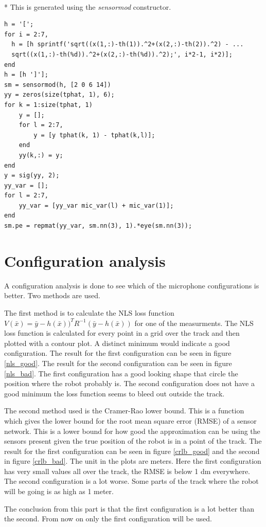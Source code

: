 \documentclass[10pt,a4paper]{report}
\begin{document}
\\*
This is generated using the \emph{sensormod} constructor.
\begin{verbatim}
h = '[';
for i = 2:7,
  h = [h sprintf('sqrt((x(1,:)-th(1)).^2+(x(2,:)-th(2)).^2) - ...
  sqrt((x(1,:)-th(%d)).^2+(x(2,:)-th(%d)).^2);', i*2-1, i*2)];
end
h = [h ']'];
sm = sensormod(h, [2 0 6 14])
yy = zeros(size(tphat, 1), 6);
for k = 1:size(tphat, 1)
    y = [];
    for l = 2:7,
        y = [y tphat(k, 1) - tphat(k,l)];
    end
    yy(k,:) = y;
end
y = sig(yy, 2);
yy_var = [];
for l = 2:7,
    yy_var = [yy_var mic_var(l) + mic_var(1)];
end
sm.pe = repmat(yy_var, sm.nn(3), 1).*eye(sm.nn(3));
\end{verbatim}
\newpage
\section{Configuration analysis}
\label{Configuration analysis}
A configuration analysis is done to see which of the microphone configurations is better.
Two methods are used.

The first method is to calculate the NLS loss function $V(\bar{x}) = \bar{y} - h(\bar{x}))^TR^{-1}(\bar{y} - h(\bar{x}))$ for one of the measurments.
The NLS loss function is calculated for every point in a grid over the track and then plotted with a contour plot.
A distinct minimum would indicate a good configuration.
The result for the first configuration can be seen in figure \ref{nls_good}.
The result for the second configuration can be seen in figure \ref{nls_bad}.
The first configuration has a good looking shape that circle the position where the robot probably is.
The second configuration does not have a good minimum the loss function seems to bleed out outside the track.

The second method used is the Cramer-Rao lower bound. This is a function which gives the lower bound for the root mean square error (RMSE) of a sensor network.
This is a lower bound for how good the approximation can be using the sensors present given the true position of the robot is in a point of the track.
The result for the first configuration can be seen in figure \ref{crlb_good} and the second in figure \ref{crlb_bad}.
The unit in the plots are meters.
Here the first configuration has very small values all over the track, the RMSE is below 1 dm everywhere.
The second configuration is a lot worse. Some parts of the track where the robot will be going is as high as 1 meter.

The conclusion from this part is that the first configuration is a lot better than the second.
From now on only the first configuration will be used.
\end{document}
